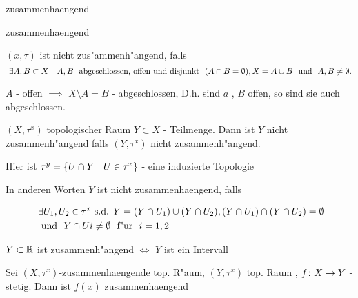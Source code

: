 \documentclass[class=article, crop=false]{standalone}
\begin{document}
\begin{zettel}{zusammenhaengend}
\begin{flashcard}[cuv84ha1]{zusammenhaengend}
	\begin{definition}
		$(x,\tau)$ ist nicht zus"ammenh"angend, falls
		\[
			\exists  A,B \subset X \quad A,B  \tx{ abgeschlossen, offen und disjunkt } (A \cap B =  \emptyset), X =  A \cup B \tx{ und } A,B \neq \emptyset
		.\]
		\begin{remark}
			$A$ - offen $\implies $ $X \setminus A =  B$ - abgeschlossen, D.h. sind $a$ , $B$ offen, so sind sie auch abgeschlossen.
		\end{remark}
	\end{definition}
\end{flashcard}
\begin{definition}
	$(X,\tau^x)$ topologischer Raum $Y \subset X$ - Teilmenge. Dann ist $Y$ nicht zusammenh"angend falls $ (Y,\tau^x)$ nicht zusammenh"angend.

	Hier ist $\tau^y =  \set{U \cap Y}{U \in  \tau^x}$ - eine induzierte Topologie

	In anderen Worten $Y$ ist nicht zusammenhaengend, falls

	\begin{align*}
		 & \exists U_1 , U_2 \in  \tau^x \text{ s.d. } Y = ( Y \cap U_1 ) \cup ( Y \cap U_2), ( Y \cap U_1 ) \cap ( Y \cap U_2) = \emptyset \\
		 & \tx{ und } Y \cap Ui \neq  \emptyset \tx{ f"ur } i = 1,2
	\end{align*}
\end{definition}
\end{zettel}

\begin{lemma}
	$Y \subset \mathbb{R} $ ist zusammenh"angend $\iff $ $Y$ ist ein Intervall
\end{lemma}

\begin{theorem}
	Sei $(X,\tau^x)$-zusammenhaengende top. R"aum, $ (Y,\tau^x)$ top. Raum , $f \colon X\to Y $ - stetig. Dann ist $f(x)$ zusammenhaengend
\end{theorem}
\end{document}
